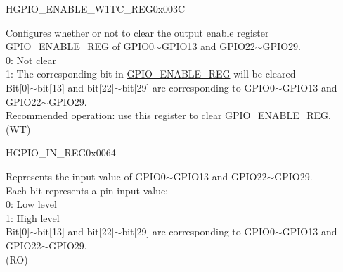 \begin{register}{H}{GPIO\_ENABLE\_W1TC\_REG}{0x003C}\label{regdesc:GPIOENABLEW1TCREG}
%
\regnewline%
\begin{regdesc}\begin{reglist}
\label{fielddesc:GPIOENABLEW1TC}\item [GPIO\_ENABLE\_W1TC] Configures whether or not to clear the output enable register \hyperref[regdesc:GPIOENABLEREG]{GPIO\_ENABLE\_REG} of GPIO0$\sim$GPIO13 and GPIO22$\sim$GPIO29. \\
0: Not clear\\
1: The corresponding bit in \hyperref[regdesc:GPIOENABLEREG]{GPIO\_ENABLE\_REG} will be cleared\\
Bit[0]$\sim$bit[13] and bit[22]$\sim$bit[29] are corresponding to GPIO0$\sim$GPIO13 and GPIO22$\sim$GPIO29.\\
Recommended operation: use this register to clear \hyperref[regdesc:GPIOENABLEREG]{GPIO\_ENABLE\_REG}.\\ (WT)
\end{reglist}\end{regdesc}
\end{register}


\begin{register}{H}{GPIO\_IN\_REG}{0x0064}\label{regdesc:GPIOINREG}
%
\regnewline%
\begin{regdesc}\begin{reglist}
\label{fielddesc:GPIOINDATANEXT}\item [GPIO\_IN\_DATA\_NEXT] Represents the input value of GPIO0$\sim$GPIO13 and GPIO22$\sim$GPIO29. \\
Each bit represents a pin input value:\\
0: Low level\\
1: High level\\ 
Bit[0]$\sim$bit[13] and bit[22]$\sim$bit[29] are corresponding to GPIO0$\sim$GPIO13 and GPIO22$\sim$GPIO29.\\
(RO)
\end{reglist}\end{regdesc}
\end{register}


